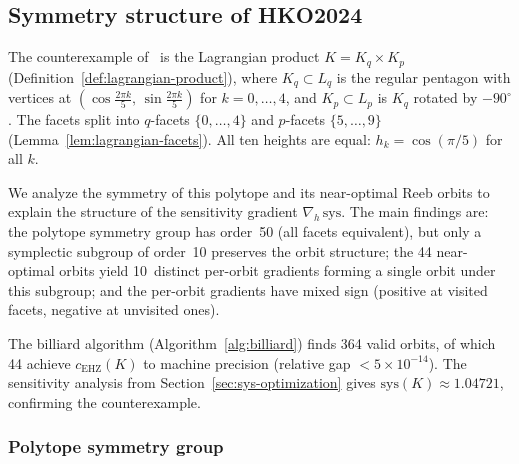 %
%
%

\subsection{Symmetry structure of HKO2024}
\label{sec:hko-symmetry}

The counterexample of~\cite{HaimKislevOstrover2024} is the Lagrangian product
$K = K_q \times K_p$ (Definition~\ref{def:lagrangian-product}),
where $K_q \subset L_q$ is the regular pentagon with vertices at
$(\cos\tfrac{2\pi k}{5},\, \sin\tfrac{2\pi k}{5})$ for $k = 0, \ldots, 4$,
and $K_p \subset L_p$ is $K_q$ rotated by $-90^\circ$.
The facets split into $q$-facets $\{0, \ldots, 4\}$ and
$p$-facets $\{5, \ldots, 9\}$
(Lemma~\ref{lem:lagrangian-facets}).
All ten heights are equal:
$h_k = \cos(\pi/5)$ for all $k$.

We analyze the symmetry of this polytope and its near-optimal
Reeb orbits to explain the structure of the sensitivity gradient
$\nabla_h\,\mathrm{sys}$.
The main findings are:
the polytope symmetry group has order~50 (all facets equivalent),
but only a symplectic subgroup of order~10 preserves the orbit structure;
the 44 near-optimal orbits yield 10~distinct per-orbit gradients
forming a single orbit under this subgroup;
and the per-orbit gradients have mixed sign
(positive at visited facets, negative at unvisited ones).

The billiard algorithm
(Algorithm~\ref{alg:billiard}) finds 364 valid orbits, of which 44
achieve $c_{\mathrm{EHZ}}(K)$ to machine precision
(relative gap $< 5 \times 10^{-14}$).
The sensitivity analysis from
Section~\ref{sec:sys-optimization} gives
$\mathrm{sys}(K) \approx 1.04721$, confirming the
counterexample.

\subsubsection*{Polytope symmetry group}

